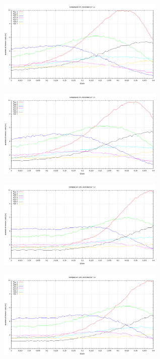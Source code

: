 \documentclass[10pt, oneside]{article} %
\begin{document}
\begin{figure}[H]
\centering
\includegraphics[width=8cm]{Figures/Porosidad/Porosidad_2vel_voronoi1.png}
\caption{}
\label{fg:4comp}
\end{figure}

\begin{figure}[H]
\centering
\includegraphics[width=8cm]{Figures/Porosidad/Porosidad_2vel_voronoi2.png}
\caption{}
\end{figure}

\begin{figure}[H]
\centering
\includegraphics[width=8cm]{Figures/Porosidad/Porosidad_2vel_voronoi3.png}
\caption{}
\end{figure}

\begin{figure}[H]
\centering
\includegraphics[width=8cm]{Figures/Porosidad/Porosidad_2vel_voronoi4.png}
\caption{}
\label{fg:7comp}
\end{figure}
\end{document}
